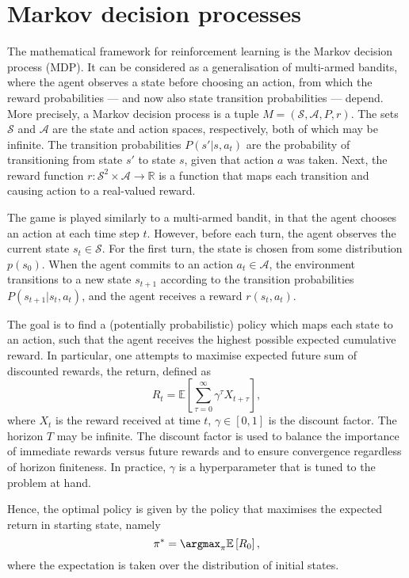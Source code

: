 \section{Markov decision processes}
The mathematical framework for reinforcement learning is the Markov decision process (MDP).
It can be considered as a generalisation of multi-armed bandits, where the agent observes a state before choosing an action, from which the reward probabilities — and now also state transition probabilities — depend.
More precisely, a Markov decision process is a tuple $M = (\mathcal{S}, \mathcal{A}, P, r)$.
The sets $\mathcal{S}$ and $\mathcal{A}$ are the state and action spaces, respectively, both of which may be infinite.
The transition probabilities $P(s' | s, a_t)$ are the probability of transitioning from state $s'$ to state $s$, given that action $a$ was taken.
Next, the reward function $r : \mathcal{S}^2 \times \mathcal{A} \to \mathbb{R}$ is a function that maps each transition and causing action to a real-valued reward.

The game is played similarly to a multi-armed bandit, in that the agent chooses an action at each time step $t$.
However, before each turn, the agent observes the current state $s_t \in \mathcal{S}$.
For the first turn, the state is chosen from some distribution $p(s_0)$.
When the agent commits to an action $a_t \in \mathcal{A}$, the environment transitions to a new state $s_{t+1}$ according to the transition probabilities $P(s_{t+1} | s_t, a_t)$, and the agent receives a reward $r(s_t, a_t)$.

The goal is to find a (potentially probabilistic) policy which maps each state to an action, such that the agent receives the highest possible expected cumulative reward.
In particular, one attempts to maximise expected future sum of discounted rewards, the return, defined as
\begin{equation}
    R_t = \mathbb{E} \left[ \sum_{\tau=0}^{\infty} \gamma^\tau X_{t+\tau} \right],
\end{equation}
where $X_t$ is the reward received at time $t$, $\gamma \in [0,1]$ is the discount factor. The horizon $T$ may be infinite.
The discount factor is used to balance the importance of immediate rewards versus future rewards and to ensure convergence regardless of horizon finiteness.
In practice, $\gamma$ is a hyperparameter that is tuned to the problem at hand.

Hence, the optimal policy is given by the policy that maximises the expected return in starting state, namely
\begin{equation}
    \pi^* = \argmax_{\pi} \mathbb{E} \left[ R_0 \right],
\end{equation}
where the expectation is taken over the distribution of initial states.

